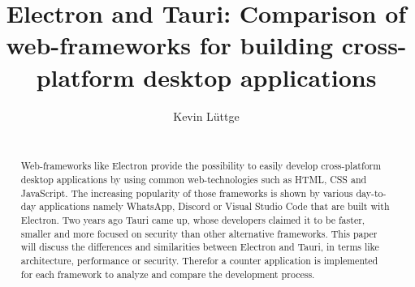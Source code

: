 \documentclass{acm_proc_article-sp}
\date{\displaydate{date}}
\begin{document}
    \title{{\ttlit Electron} and {\ttlit Tauri}: Comparison of web-frameworks for building cross-platform desktop applications}
    \author{
        \alignauthor
        Kevin L\"uttge \\
        \\
    }

    \maketitle

    \begin{abstract}
        Web-frameworks like Electron provide the possibility to easily develop cross-platform desktop applications by using common web-technologies
        such as \ac{HTML}, \ac{CSS} and JavaScript.
        The increasing popularity of those frameworks is shown by various day-to-day applications namely WhatsApp, Discord or Visual Studio Code
        that are built with Electron.
        Two years ago Tauri came up, whose developers claimed it to be faster, smaller and more focused on security than other alternative frameworks.
        This paper will discuss the differences and similarities between Electron and Tauri, in terms like architecture, performance or security.
        Therefor a counter application is implemented for each framework to analyze and compare the development process.
    \end{abstract}

    
    
    
    
    
    
    
    \newpage

    
    

    \balancecolumns
\end{document}
